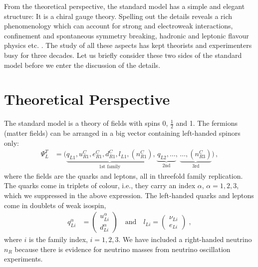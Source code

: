 \documentclass[12pt]{report}
\newcommand{\ls}{{\ensuremath{\scriptscriptstyle L}}}
\newcommand{\rs}{{\ensuremath{\scriptscriptstyle R}}}
\newcommand{\cs}{{\ensuremath{\scriptscriptstyle C}}}
\newcommand{\2}{\ensuremath{\sqrt{2}\,}}
\begin{document}
    From the theoretical perspective, the standard model has a simple and elegant structure: It 
    is a chiral gauge theory. Spelling out the details reveals a rich phenomenology which can
    account for strong and electroweak interactions, confinement and spontaneous symmetry breaking,
    hadronic and leptonic flavour physics etc. \cite{Nachtmann:1990ta,peskin}.
    The study of all these aspects has kept theorists
    and experimenters busy for three decades. Let us briefly consider these two sides of the
    standard model before we enter the discussion of the details.  


    \section{Theoretical Perspective}
    The standard model is a theory of fields with spins 0, $\frac{1}{2}$ and 1. The fermions
    (matter fields) can be arranged in a big vector containing left-handed spinors only:
    \begin{align}
      \Psi^T_L&=\big(\underbrace{q_{\ls \scriptscriptstyle 1}, u_{\rs
          \scriptscriptstyle 1}^\cs, e_{\rs \scriptscriptstyle 1}^\cs,
        d_{\rs \scriptscriptstyle 1}^\cs,l_{\ls \scriptscriptstyle
          1},\left(n_{\rs \scriptscriptstyle 1}^\cs\right)}_\text{1st family},\,\underbrace{q_{\ls
            \scriptscriptstyle 2},\ldots}_\text{2nd},\,\underbrace{\ldots,\left(n_{\rs
              \scriptscriptstyle 3}^\cs\right)}_\text{3rd}\big) \, ,
    \end{align}
    where the fields are the quarks and leptons, all in threefold family replication.
    The quarks come in triplets of colour, i.e., they
    carry an index $\alpha$, $\alpha=1,2,3$, which we suppressed in the above
    expression. The left-handed quarks and leptons come in doublets of weak isospin,
    \begin{align*}
      q_{\ls i}^\alpha&=\begin{pmatrix} u_{\ls i}^\alpha\\ d_{\ls i}^\alpha\end{pmatrix} \quad\text{and}\quad
      l_{\ls i}=\begin{pmatrix} \nu_{\ls i}\\ e_{\ls i}\end{pmatrix} \;,
    \end{align*}
    where $i$ is the family index, $i= 1,2,3$. 
    We have included a right-handed neutrino $n_\rs$ because there is evidence for neutrino masses
    from  neutrino oscillation experiments.
\end{document}
